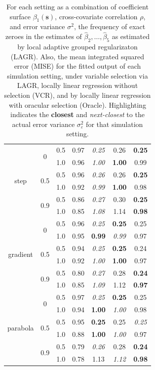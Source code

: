 \documentclass[authoryear,review, 12pt]{elsarticle}
\begin{document}
\begin{table}
\begin{tabular}{|ccc|c|ccc|}
  \multirow{6}{*}{step} & \multirow{2}{*}{0} & 0.5 & 0.97 & \emph{0.25} & 0.26 & \textbf{0.25} \\ 
    &  & 1.0 & 0.96 & \emph{1.00} & \textbf{1.00} & 0.99 \\ 
    & \multirow{2}{*}{0.5} & 0.5 & 0.96 & \emph{0.26} & 0.26 & \textbf{0.25} \\ 
    &  & 1.0 & 0.92 & \emph{0.99} & \textbf{1.00} & 0.98 \\ 
    & \multirow{2}{*}{0.9} & 0.5 & 0.86 & \emph{0.27} & 0.30 & \textbf{0.25} \\ 
    &  & 1.0 & 0.85 & \emph{1.08} & 1.14 & \textbf{0.98} \\ 
   \hline \multirow{6}{*}{gradient} & \multirow{2}{*}{0} & 0.5 & 0.96 & \emph{0.25} & \textbf{0.25} & 0.25 \\ 
    &  & 1.0 & 0.95 & \textbf{0.99} & \emph{0.99} & 0.97 \\ 
    & \multirow{2}{*}{0.5} & 0.5 & 0.94 & \emph{0.25} & \textbf{0.25} & 0.24 \\ 
    &  & 1.0 & 0.92 & \emph{1.00} & \textbf{1.00} & 0.97 \\ 
    & \multirow{2}{*}{0.9} & 0.5 & 0.80 & \emph{0.27} & 0.28 & \textbf{0.24} \\ 
    &  & 1.0 & 0.85 & \emph{1.09} & 1.12 & \textbf{0.97} \\ 
   \hline \multirow{6}{*}{parabola} & \multirow{2}{*}{0} & 0.5 & 0.97 & \emph{0.25} & \textbf{0.25} & 0.25 \\ 
    &  & 1.0 & 0.94 & \textbf{1.00} & \emph{1.00} & 0.98 \\ 
    & \multirow{2}{*}{0.5} & 0.5 & 0.95 & \textbf{0.25} & 0.25 & \emph{0.25} \\ 
    &  & 1.0 & 0.88 & \textbf{1.00} & \emph{1.00} & 0.97 \\ 
    & \multirow{2}{*}{0.9} & 0.5 & 0.79 & \emph{0.26} & 0.28 & \textbf{0.24} \\ 
    &  & 1.0 & 0.78 & 1.13 & \emph{1.12} & \textbf{0.98} \\ 
  
	\hline
	\end{tabular}
	\caption{For each setting as a combination of coefficient surface $\beta_1(\bm{s})$, cross-covariate correlation $\rho$, and error variance $\sigma^2$, the frequency of exact zeroes in the estimates of $\hat{\beta}_2,\dots,\hat{\beta}_5$ as estimated by local adaptive grouped regularizaton (LAGR). Also, the mean integrated squared error (MISE) for the fitted output of each simulation setting, under variable selection via LAGR, locally linear regression without selection (VCR), and by locally linear regression with oracular selection (Oracle). Highlighting indicates the \textbf{closest} and \emph{next-closest} to the actual error variance $\sigma_\varepsilon^2$ for that simulation setting.}
	\label{tab:misey}
\end{table}
\end{document}
